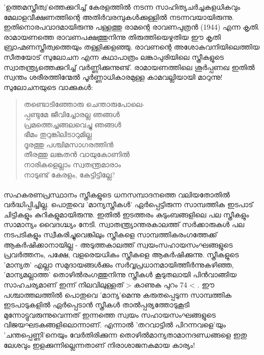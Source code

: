 \label{ch4box3} %
\begin{tcolorbox}[%
 breakable, %
  arc=0mm, 
  left=1pt, right = 1pt, 
  boxrule=0mm,
  colback = {blue!10}, %
] 
\noindent

'ഉത്തമസ്ത്രീത്വ'ത്തെക്കുറിച്ച് കേരളത്തിൽ നടന്ന സാഹിത്യചർച്ചകളധികവും മേലാളവീക്ഷണത്തിന്റെ അതിർവരമ്പുകൾക്കുള്ളിൽ നടന്നവയായിരുന്നു. ഇതിനൊരപവാദമായിരുന്നു പള്ളത്തു രാമന്റെ രാവണപുത്രൻ (1944) എന്ന കൃതി. രാമായണത്തെ രാവണപക്ഷത്തുനിന്നു തിരുത്തിയെഴുതിയ ഈ കൃതി ബ്രാഹ്മണസ്ത്രീത്വത്തെയും തള്ളിക്കളഞ്ഞു. രാവണന്റെ അശോകവനിയിലെത്തിയ സീതയോട് സുലോചന എന്ന കഥാപാത്രം ലങ്കാപുരിയിലെ സ്ത്രീകളുടെ സ്വാതന്ത്യ്രത്തെക്കുറിച്ച് വർണ്ണിക്കുന്നുണ്ട്. രാമായണത്തിലെ ശൂർപ്പണഖ ഇതിൽ സ്വന്തം ശരീരത്തിന്മേൽ പൂർണ്ണാധികാരമുള്ള കാമവല്ലിയായി മാറുന്നു!
സുലോചനയുടെ വാക്കുകൾ:
\begin{quote}
തണ്ടൊടിഞ്ഞോരു ചെന്താരുപോലെ-\\
പ്പണ്ടുമേ ജീവിച്ചോരല്ല ഞങ്ങൾ\\
പ്രമത്തെച്ചങ്ങലവെച്ചു ഞങ്ങൾ\\
ഭീമം തുറുങ്കിലിടാറുമില്ല\\
ദൂരത്തു പശ്ചിമസാഗരത്തിൻ\\
തീരത്തു ലങ്കതൻ വായുകോണിൽ\\
നാരികളെല്ലാം സ്വതന്ത്രമാരാം\\
നാടുണ്ട് കേരളം, കേട്ടിട്ടില്ലേ?\\
\end{quote}
\end{tcolorbox}

\paragraph{}സഹകരണപ്രസ്ഥാനം സ്ത്രീകളുടെ ധനസമ്പാദനത്തെ വലിയതോതിൽ വർദ്ധിപ്പിച്ചില്ല. പൊതുവെ 'മാന്യസ്ത്രീകൾ' ഏർപ്പെട്ടിരുന്ന സാമ്പത്തിക ഇടപാട് ചിട്ടികളും കുറികളുമായിരുന്നു. ഇതിൽ ഇടത്തരം കുടുംബങ്ങളിലെ പല സ്ത്രീകളും സാമാന്യം വൈദഗ്ദ്ധ്യം നേടി. സ്വാതന്ത്ര്യാന്തരകാലത്ത് സർക്കാരുകൾ പല നടപടികളും സ്വീകരിച്ചുവെങ്കിലും സ്ത്രീകളെ സാമ്പത്തികരംഗത്തേക്ക് ആകർഷിക്കാനായില്ല - അടുത്തകാലത്ത് സ്വയംസഹായസംഘങ്ങളുടെ പ്രവർത്തനം, പക്ഷേ, വളരെയധികം സ്ത്രീകളെ ആകർഷിക്കുന്നു. സ്ത്രീകളുടെ 'മാന്യത' എല്ലാ സമുദായങ്ങൾക്കും സർവ്വപ്രധാനമായിത്തീർന്നുകഴിഞ്ഞ, 'മാന്യമല്ലാത്ത' തൊഴിൽരംഗത്തുനിന്നു സ്ത്രീകൾ കൂടുതലായി പിൻവാങ്ങിയ സാഹചര്യമാണ് ഇന്ന് നിലവിലുള്ളത് > കാണുക പുറം 74 < . ഈ പശ്ചാത്തലത്തിൽ പൊതുവെ 'മാന്യ'മെന്നു കരുതപ്പെടുന്ന സാമ്പത്തിക ഇടപാടുകളിൽ ഏർപ്പെടാൻ സ്ത്രീകൾ താൽപ്പര്യത്തോടുകൂടി മുന്നോട്ടുവരുന്നുവെന്നത് ഇന്നത്തെ സ്വയം സഹായസംഘങ്ങളുടെ വിജയഘടകങ്ങളിലൊന്നാണ്. എന്നാൽ 'തറവാട്ടിൽ പിറന്നവളെ'യും 'ചന്തപ്പെണ്ണി'നെയും വേർതിരിക്കുന്ന തൊഴിൽമാന്യതാമാനദണ്ഡങ്ങളെ ഇതു ലേശവും ഇളക്കുന്നില്ലെന്നതാണ് നിരാശാജനകമായ കാര്യം!



